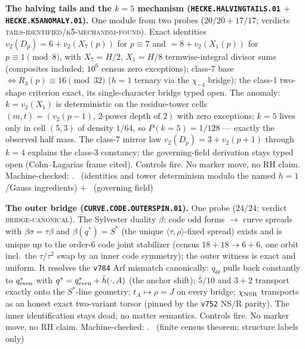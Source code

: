 \documentclass[11pt,a4paper]{article}
\theoremstyle{definition}
\begin{document}
\par\smallskip\noindent\textbf{The halving tails and the $k=5$
mechanism (\texttt{HECKE.HALVINGTAILS.01} $+$
\texttt{HECKE.K5ANOMALY.01}).}
One module from two probes ($20/20+17/17$; verdicts
\textsc{tails-identified}/\textsc{k5-mechanism-found}).  Exact
identities $v_2(D_p)=6+v_2(X_7(p))$ for $p\equiv7$ and
$=8+v_2(X_1(p))$ for $p\equiv1\pmod 8$, with $X_7=H/2$, $X_1=H/8$
termwise-integral divisor sums (composites included; $10^6$ census
zero exceptions); class-7 base $\iff R_3(p)\equiv16\pmod{32}$
($h=1$ ternary via the $\chi_{-4}$ bridge); the class-1 two-shape
criterion exact, its single-character bridge typed open.  The
anomaly: $k=v_2(X_1)$ is deterministic on the residue-tower cells
$(m,t)=(v_2(p{-}1),\,\text{2-power depth of }2)$ with zero
exceptions; $k=5$ lives only in cell $(5,3)$ of density $1/64$, so
$P(k{=}5)=1/128$ --- exactly the observed half mass.  The class-7
mirror law $v_2(D_p)=3+v_2(p{+}1)$ through $k=4$ explains the
class-3 constancy; the governing-field derivation stays typed open
(Cohn--Lagarias frame cited).  Controls fire.  No marker move, no
RH claim.
Machine-checked: .
\mE\ (identities and tower determinism modulo the named $h=1$/Gauss
ingredients) $+$ \mO\ (governing field)
\par\smallskip

\par\smallskip\noindent\textbf{The outer bridge
(\texttt{CURVE.CODE.OUTERSPIN.01}).}
One probe ($24/24$; verdict \textsc{bridge-canonical}).  The
Sylvester duality $\beta$: code odd forms $\to$ curve spreads with
$\beta\sigma=\tau\beta$ and $\beta(q^{*})=S^{*}$ (the unique
$\langle\tau,\rho\rangle$-fixed spread) exists and is unique up to
the order-6 code joint stabilizer (census $18+18\to6+6$, one orbit
incl.\ the $\tau/\tau^2$ swap by an inner code symmetry); the outer
witness is exact and uniform.  It resolves the \texttt{v784} Arf
mismatch canonically: $q_{\Theta}$ pulls back constantly to
$q^{*}_{\rm even}$ with $q^{*}=q^{*}_{\rm even}+\bar h(\cdot,A)$
(the anchor shift); $\bar 5/10$ and $3{+}2$ transport exactly onto
the $S^{*}$-line geometry; $t_A\mapsto\rho=J$ on every bridge;
$\chi_{\rm NSR}$ transports as an honest exact two-variant torsor
(pinned by the \texttt{v752} NS/R parity).  The inner identification
stays dead; no matter semantics.  Controls fire.  No marker move,
no RH claim.
Machine-checked: .
\mE\ (finite census theorem; structure labels only)
\par\smallskip
\end{document}
